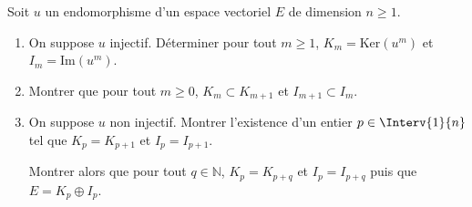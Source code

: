 \documentclass[a4paper,10pt]{report}
\begin{document}
\begin{Exercice}{}
Soit $u$ un endomorphisme d'un espace vectoriel $E$ de dimension $n \geq 1$.
\begin{enumerate}
\item On suppose $u$ injectif. Déterminer pour tout $m \geq 1$, $K_m = \textrm{Ker}(u^m)$ et $I_m = \textrm{Im}(u^m)$.
\item Montrer que pour tout $m \geq 0$, $K_m \subset K_{m+1}$ et $I_{m+1} \subset I_m$.
\item On suppose $u$ non injectif. Montrer l'existence d'un entier $p \in \Interv{1}{n}$ tel que $K_p=K_{p+1}$ et $I_p = I_{p+1}$.

\noindent Montrer alors que pour tout $q \in \mathbb{N}$, $K_p = K_{p+q}$ et $I_p = I_{p+q}$ puis que $E = K_p \oplus I_p$.
\end{enumerate}
\end{Exercice} 
\end{document}
